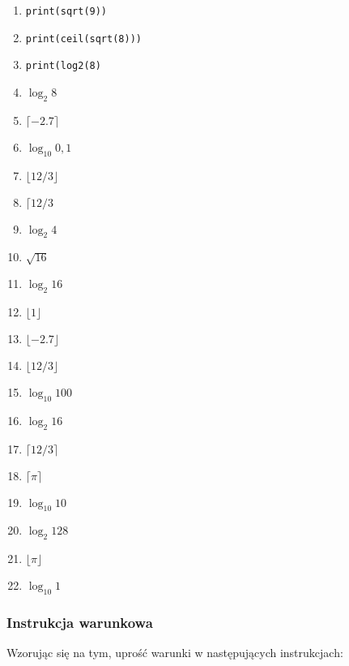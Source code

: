 \documentclass[a4paper]{article}
\begin{document}
\begin{multicols}{3}
    \begin{enumerate}[label=\arabic*.]
        \item \lstinline|print(sqrt(9))|
        \item \lstinline|print(ceil(sqrt(8)))|
        \item \lstinline|print(log2(8)|
        \item $\log_{2} 8$
        \item $\lceil{-2.7}\rceil$
        \item $\log_{10} 0{,}1$
        \item $\lfloor{12/3}\rfloor$
        \item $\lceil{12/3}$
        \item $\log_{2} 4$
        \item $\sqrt{16}$
        \item $\log_{2} 16$
        \item $\lfloor{1}\rfloor$
        \item $\lfloor{-2.7}\rfloor$
        \item $\lfloor{12/3}\rfloor$
        \item $\log_{10} 100$
        \item $\log_{2} 16$
        \item $\lceil{12/3}\rceil$
        \item $\lceil{\pi}\rceil$
        \item $\log_{10} 10 $
        \item $\log_{2} 128$
        \item $\lfloor{\pi}\rfloor$
        \item $\log_{10} 1$
    \end{enumerate}
\end{multicols}


\subsubsection{Instrukcja warunkowa}


Wzorując się na tym, uprość warunki w następujących instrukcjach:

\end{document}
